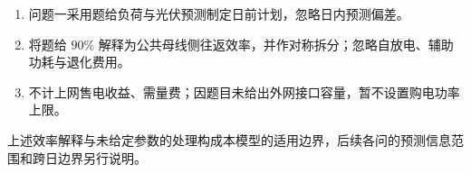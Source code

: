 \begin{enumerate}[label=\textbf{假设\arabic*：},leftmargin=4.7em,labelsep=0.4em,itemsep=0.2em]
\item 问题一采用题给负荷与光伏预测制定日前计划，忽略日内预测偏差。
\item 将题给 $90\%$ 解释为公共母线侧往返效率，并作对称拆分；忽略自放电、辅助功耗与退化费用。
\item 不计上网售电收益、需量费；因题目未给出外网接口容量，暂不设置购电功率上限。
\end{enumerate}
上述效率解释与未给定参数的处理构成本模型的适用边界，后续各问的预测信息范围和跨日边界另行说明。
